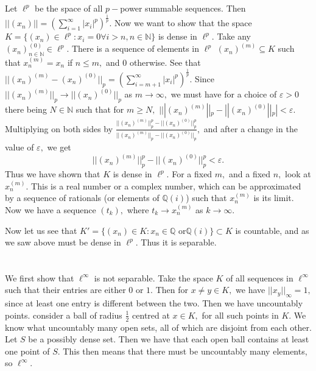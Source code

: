 \documentclass{article}
\begin{document}
\section{} %
Let $\ell^p$ be the space of all $p-$power summable sequences. Then $||(x_n)|| =(\sum_{i=1}^{\infty}|x_i|^p)^\frac{1}{p}.$ Now we want to show that the 
space 
$K=\{(x_n) \in \ell^p: x_i=0 \forall i>n, n \in \mathbb{N}\}$ is dense in $\ell^p.$ Take any $(x_n)^{(0)}_{n \in \mathbb{N}} \in \ell^p.$ There is a 
sequence of elements in $\ell^p$ $(x_n)^{(m)} \subseteq K$ such that $x_n^{(m)}=x_n$ if $n \leq m,$ and $0$ otherwise. See that 
$||(x_n)^{(m)}-(x_n)^{(0)}||_p=\left(\sum_{i=m+1}^{\infty}|x_i|^p\right)^{\frac{1}{p}}.$ Since $||(x_n)^{(m)}||_p \to ||(x_n)^{(0)}||_p$ as $m \to \infty,$ 
we must have for a choice of $\varepsilon >0$ there being $N \in \mathbb{N}$ such that for $m \geq N,$ $|||(x_n)^{(m)}||_p - ||(x_n)^{(0)}||_p|< 
\varepsilon. $ Multiplying on both sides by $\frac{||(x_n)^{(m)}||^p_p - ||(x_n)^{(0)}||^p_p}{||(x_n)^{(m)}||_p - ||(x_n)^{(0)}||_p},$ and after a change in 
the value of $\varepsilon,$ we get $$||(x_n)^{(m)}||^p_p - ||(x_n)^{(0)}||^p_p< \varepsilon.$$ Thus we have shown that $K$ is dense in $\ell^p.$ For a fixed 
$m,$ and a fixed $n,$ look at $x_n^{(m)}.$ This is a real number or a complex number, which can be approximated by a sequence of rationals (or elements of 
$\mathbb{Q}(i)$) such that $x_n^{(m)}$ is its limit. Now we have a sequence $(t_k),$ where $t_k \to x_n^{(m)}$ as $k \to \infty.$ 

Now let us see that $K'=\{(x_n) \in K: x_n \in \mathbb{Q} \text{ or} \mathbb{Q}(i)\} \subset K$ is countable, and as we saw above must be dense in $\ell^p.$ 
Thus it is separable.  
\section{} %
We first show that $\ell^{\infty}$ is not separable. Take the space $K$ of all sequences in $\ell^{\infty}$ such that their entries are either $0$ or $1.$ 
Then for $x \neq y \in K,$ we have $||x_y||_{\infty} = 1,$ since at least one entry is different between the two. Then we have uncountably points. consider 
a ball of radius $\frac{1}{2}$ centred at $x \in K,$ for all such points in $K.$ We know what uncountably many open sets, all of which are disjoint from 
each other. Let $S$ be a possibly dense set. Then we have that each open ball contains at least one point of $S.$ This then means that there must be 
uncountably many elements, so $\ell^{\infty}.$ 
\end{document}
